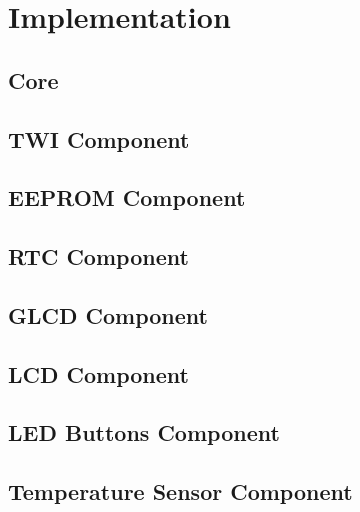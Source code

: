 
\chapter{Implementation} \label{chapter:implementation}

\section{Core}

\section{\acf{TWI} Component}

\section{\acf{EEPROM} Component}

\cite{microchip01}

\section{\acf{RTC} Component}

\cite{maxim01}

\section{\acf{GLCD} Component}

\cite{winstar01, samsung01, neotec01}

\section{\acf{LCD} Component}

\cite{hitachi01, samsung02, winstar02}

\section{\acf{LED} Buttons Component}

\section{Temperature Sensor Component}

\cite{maxim02}